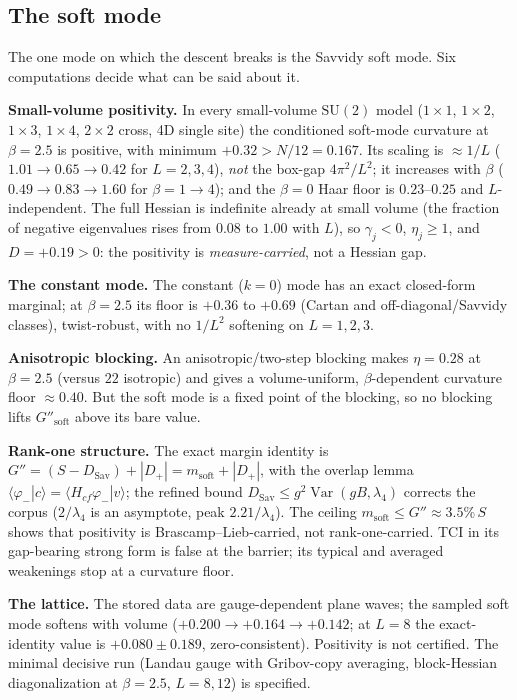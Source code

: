 \documentclass[11pt,a4paper]{article}
\begin{document}
\subsection{The soft mode}
\label{sec:soft}

The one mode on which the descent breaks is the Savvidy soft mode. Six computations decide what can
be said about it.

\textbf{Small-volume positivity.} In every small-volume $\mathrm{SU}(2)$ model ($1\times1$,
$1\times2$, $1\times3$, $1\times4$, $2\times2$ cross, 4D single site) the conditioned soft-mode
curvature at $\beta=2.5$ is positive, with minimum $+0.32>N/12=0.167$. Its scaling is
$\approx1/L$ ($1.01\to0.65\to0.42$ for $L=2,3,4$), \emph{not} the box-gap $4\pi^2/L^2$; it increases
with $\beta$ ($0.49\to0.83\to1.60$ for $\beta=1\to4$); and the $\beta=0$ Haar floor is
$0.23$--$0.25$ and $L$-independent. The full Hessian is indefinite already at small volume (the
fraction of negative eigenvalues rises from $0.08$ to $1.00$ with $L$), so $\gamma_j<0$,
$\eta_j\ge1$, and $D=+0.19>0$: the positivity is \emph{measure-carried}, not a Hessian gap.

\textbf{The constant mode.} The constant ($k=0$) mode has an exact closed-form marginal; at
$\beta=2.5$ its floor is $+0.36$ to $+0.69$ (Cartan and off-diagonal/Savvidy classes), twist-robust,
with no $1/L^2$ softening on $L=1,2,3$.

\textbf{Anisotropic blocking.} An anisotropic/two-step blocking makes $\eta=0.28$ at $\beta=2.5$
(versus $22$ isotropic) and gives a volume-uniform, $\beta$-dependent curvature floor
$\approx0.40$. But the soft mode is a fixed point of the blocking, so no blocking lifts
$G''_{\mathrm{soft}}$ above its bare value.

\textbf{Rank-one structure.} The exact margin identity is
$G''=(S-D_{\mathrm{Sav}})+|D_+|=m_{\mathrm{soft}}+|D_+|$, with the overlap lemma
$\langle\varphi_-|c\rangle=\langle H_{cf}\varphi_-|v\rangle$; the refined bound
$D_{\mathrm{Sav}}\le g^2\operatorname{Var}(gB,\lambda_4)$ corrects the corpus ($2/\lambda_4$ is an
asymptote, peak $2.21/\lambda_4$). The ceiling $m_{\mathrm{soft}}\le G''\approx3.5\%\,S$ shows that
positivity is Brascamp--Lieb-carried, not rank-one-carried. TCI in its gap-bearing strong form is
false at the barrier; its typical and averaged weakenings stop at a curvature floor.

\textbf{The lattice.} The stored data are gauge-dependent plane waves; the sampled soft mode softens
with volume ($+0.200\to+0.164\to+0.142$; at $L=8$ the exact-identity value is $+0.080\pm0.189$,
zero-consistent). Positivity is not certified. The minimal decisive run (Landau gauge with
Gribov-copy averaging, block-Hessian diagonalization at $\beta=2.5$, $L=8,12$) is specified.
\end{document}
